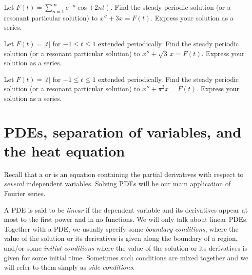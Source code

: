\begin{exercise}
Let $F(t) = \sum_{n=1}^\infty e^{-n} \cos(2 n t)$.
Find the steady periodic solution (or a resonant particular solution) to $x'' + 3 x = F(t)$.
Express your solution as a series.
\end{exercise}

\begin{exercise}
Let $F(t) = \lvert t \rvert$ for $-1 \leq t \leq 1$ extended periodically.
Find the steady periodic solution (or a resonant particular solution) to $x'' + \sqrt{3}\, x = F(t)$.
Express your solution as a series.
\end{exercise}

\begin{exercise}
Let $F(t) = \lvert t \rvert$ for $-1 \leq t \leq 1$ extended periodically.
Find the steady periodic solution (or a resonant particular solution) to $x'' + \pi^2 x = F(t)$.
Express your solution as a series.
\end{exercise}



\sectionnewpage
\section{PDEs, separation of variables, and the heat equation}
\label{heateq:section}



Recall that a \emph{} or
\emph{} is an equation containing the partial derivatives
with respect to \emph{several} independent variables.  Solving PDEs
will be our main application of Fourier series.

A PDE is said to be \emph{linear} if the dependent
variable and its derivatives appear at most to the first power and in no
functions.  We will only talk about linear PDEs.  Together with a PDE\@,
we usually specify some
\emph{boundary conditions},
where the value of the solution or its derivatives is given along
the boundary of a region, and/or
some 
\emph{initial conditions} where the value
of the solution or its derivatives is given for some initial time.
Sometimes such conditions are mixed together and we will refer to them
simply as 
\emph{side conditions}.

